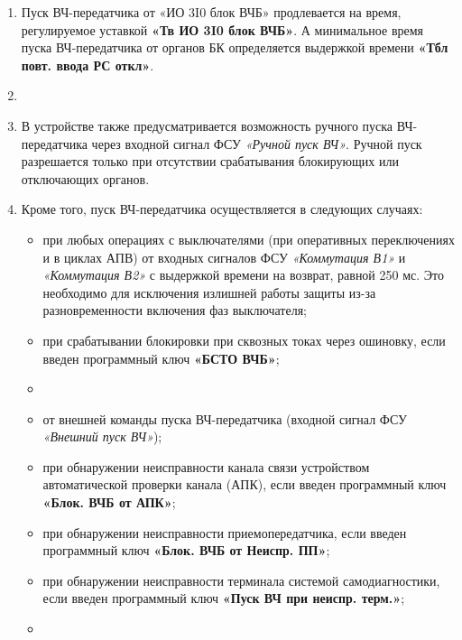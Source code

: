 \begin{enumerate}
\begin{enumerate}
\item
Пуск ВЧ-передатчика от «ИО 3I0 блок ВЧБ» продлевается на время, регулируемое уставкой \textbf{«Тв ИО 3I0 блок ВЧБ»}.
А минимальное время пуска ВЧ-передатчика от органов БК определяется выдержкой времени \textbf{«Тбл повт. ввода РС откл»}. 

\item
{}

\item
В устройстве также предусматривается возможность ручного пуска ВЧ-передатчика через входной сигнал ФСУ \textit{«Ручной пуск ВЧ»}.
Ручной пуск разрешается только при отсутствии срабатывания блокирующих или отключающих органов.

\item
Кроме того, пуск ВЧ-передатчика осуществляется в следующих случаях:
\begin{itemize} 
\item при любых операциях с выключателями (при оперативных переключениях и в циклах АПВ) от входных сигналов ФСУ \textit{«Коммутация В1»} и \textit{«Коммутация В2»} с выдержкой времени на возврат, равной 250 мс.
Это необходимо для исключения излишней работы защиты из-за разновременности включения фаз выключателя; 
\item при срабатывании блокировки при сквозных токах через ошиновку, если введен программный ключ \textbf{«БСТО ВЧБ»};
\item {}
\item от внешней команды пуска ВЧ-передатчика (входной сигнал ФСУ \textit{«Внешний пуск ВЧ»});
\item при обнаружении неисправности канала связи устройством автоматической проверки канала (АПК), если введен программный ключ \textbf{«Блок. ВЧБ от АПК»};
\item при обнаружении неисправности приемопередатчика, если введен программный ключ \textbf{«Блок. ВЧБ от Неиспр. ПП»};
\item при обнаружении неисправности терминала системой самодиагностики, если введен программный ключ \textbf{«Пуск ВЧ при неиспр. терм.»};
\item {}
\end{itemize}


\end{enumerate}
\end{enumerate}
